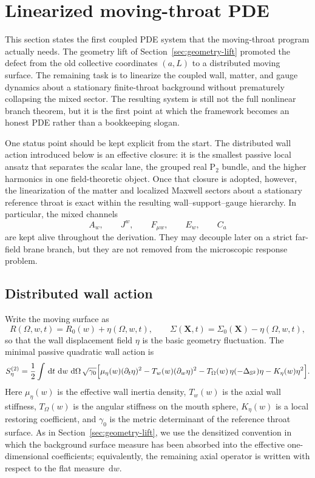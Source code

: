\documentclass[11pt]{article}
\theoremstyle{definition}
\newcommand{\dd}{\,\mathrm{d}}
\newcommand{\Ptwo}{\ensuremath{\mathrm{P}_2}}
\newcommand{\bbS}{\mathbb S}
\begin{document}
\section{Linearized moving-throat PDE}
\label{sec:linearized-pde}

This section states the first coupled PDE system that the moving-throat program actually needs. The geometry lift of Section~\ref{sec:geometry-lift} promoted the defect from the old collective coordinates $(a,L)$ to a distributed moving surface. The remaining task is to linearize the coupled wall, matter, and gauge dynamics about a stationary finite-throat background without prematurely collapsing the mixed sector. The resulting system is still not the full nonlinear branch theorem, but it is the first point at which the framework becomes an honest PDE rather than a bookkeeping slogan.

One status point should be kept explicit from the start. The distributed wall action introduced below is an effective closure: it is the smallest passive local ansatz that separates the scalar lane, the grouped real $\Ptwo$ bundle, and the higher harmonics in one field-theoretic object. Once that closure is adopted, however, the linearization of the matter and localized Maxwell sectors about a stationary reference throat is exact within the resulting wall--support--gauge hierarchy. In particular, the mixed channels
\[
A_w,
\qquad
J^w,
\qquad
F_{\mu w},
\qquad
E_w,
\qquad
C_a
\]
are kept alive throughout the derivation. They may decouple later on a strict far-field brane branch, but they are not removed from the microscopic response problem.

\subsection{Distributed wall action}

Write the moving surface as
\[
R(\Omega,w,t)=R_0(w)+\eta(\Omega,w,t),
\qquad
\Sigma(\mathbf X,t)=\Sigma_0(\mathbf X)-\eta(\Omega,w,t),
\]
so that the wall displacement field $\eta$ is the basic geometry fluctuation. The minimal passive quadratic wall action is
\begin{equation}
S_\eta^{(2)}
=
\frac12\int \dd t\,\dd w\,\dd\Omega\,\sqrt{\gamma_0}
\Bigl[
\mu_\eta(w)(\partial_t\eta)^2
-
T_w(w)(\partial_w\eta)^2
-
T_\Omega(w)\,\eta(-\Delta_{\bbS^2})\eta
-
K_\eta(w)\eta^2
\Bigr].
\label{eq:linpde-wall-action}
\end{equation}
Here $\mu_\eta(w)$ is the effective wall inertia density, $T_w(w)$ is the axial wall stiffness, $T_\Omega(w)$ is the angular stiffness on the mouth sphere, $K_\eta(w)$ is a local restoring coefficient, and $\gamma_0$ is the metric determinant of the reference throat surface. As in Section~\ref{sec:geometry-lift}, we use the densitized convention in which the background surface measure has been absorbed into the effective one-dimensional coefficients; equivalently, the remaining axial operator is written with respect to the flat measure $\dd w$.
\end{document}

